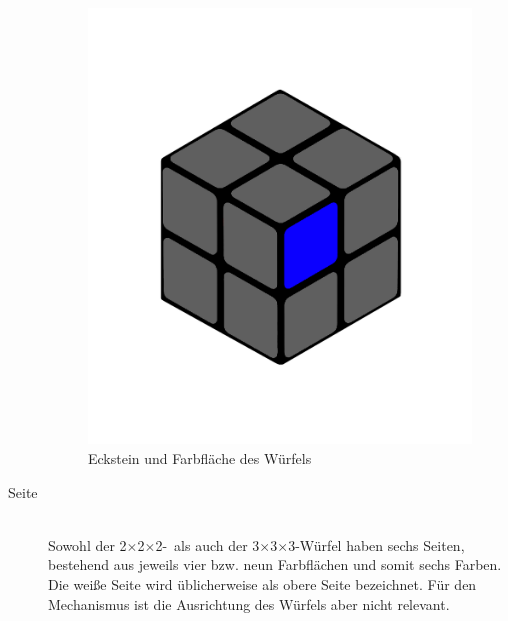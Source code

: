 \documentclass[12pt,a4paper, usenames, dvipsnames]{article}
\theoremstyle{mystyle}
\theoremstyle{definition}
\newcommand{\Ttwo}{2$\times$2$\times$2-}
\newcommand{\Tthree}{3$\times$3$\times$3-}
\begin{document}
\begin{description}
\begin{figure}[h]
\includegraphics[scale=0.1]{2x2farbflaeche.png}
\caption[Eckstein und Farbfläche des Würfels]{Eckstein und Farbfläche des Würfels}
\label{Abbildung_Eckstein}
\end{figure} 


\newpage

\item[Seite] \ \\
Sowohl der \Ttwo \ als auch der \Tthree Würfel haben sechs Seiten, bestehend aus jeweils vier bzw. neun Farbflächen und somit sechs Farben. Die weiße Seite wird üblicherweise als obere Seite bezeichnet. Für den Mechanismus ist die Ausrichtung des Würfels aber nicht relevant.


\end{description}
\end{document}
